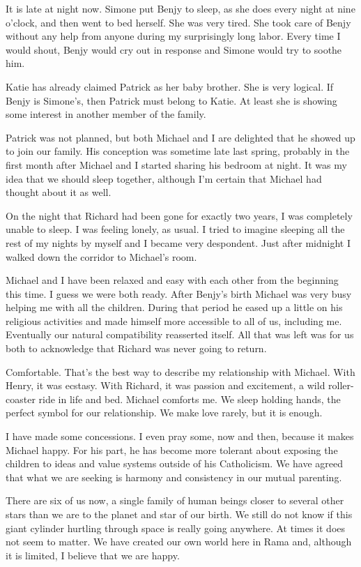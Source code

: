 \documentclass[]{article}
\begin{document}
It is late at night now.  Simone put Benjy to sleep, as she does every night at nine o’clock, and then went to bed herself.  She was very tired.  She took care of Benjy without any help from anyone during my surprisingly long labor.  Every time I would shout, Benjy would cry out in response and Simone would try to soothe him.

Katie has already claimed Patrick as her baby brother.  She is very logical.  If Benjy is Simone’s, then Patrick must belong to Katie.  At least she is showing some interest in another member of the family.

Patrick was not planned, but both Michael and I are delighted that he showed up to join our family.  His conception was sometime late last spring, probably in the first month after Michael and I started sharing his bedroom at night.  It was my idea that we should sleep together, although I’m certain that Michael had thought about it as well.

On the night that Richard had been gone for exactly two years, I was completely unable to sleep.  I was feeling lonely, as usual.  I tried to imagine sleeping all the rest of my nights by myself and I became very despondent.  Just after midnight I walked down the corridor to Michael’s room.

Michael and I have been relaxed and easy with each other from the beginning this time.  I guess we were both ready.  After Benjy’s birth Michael was very busy helping me with all the children.  During that period he eased up a little on his religious activities and made himself more accessible to all of us, including me.  Eventually our natural compatibility reasserted itself.  All that was left was for us both to acknowledge that Richard was never going to return.

Comfortable.  That’s the best way to describe my relationship with Michael.  With Henry, it was ecstasy.  With Richard, it was passion and excitement, a wild roller-coaster ride in life and bed.  Michael comforts me.  We sleep holding hands, the perfect symbol for our relationship.  We make love rarely, but it is enough.

I have made some concessions.  I even pray some, now and then, because it makes Michael happy.  For his part, he has become more tolerant about exposing the children to ideas and value systems outside of his Catholicism.  We have agreed that what we are seeking is harmony and consistency in our mutual parenting.

There are six of us now, a single family of human beings closer to several other stars than we are to the planet and star of our birth.  We still do not know if this giant cylinder hurtling through space is really going anywhere.  At times it does not seem to matter.  We have created our own world here in Rama and, although it is limited, I believe that we are happy.
\end{document}
